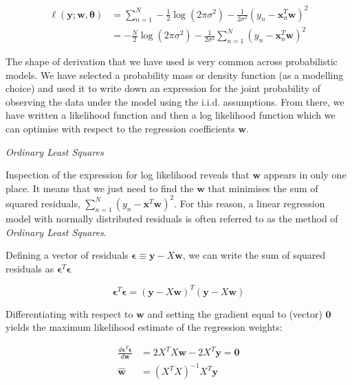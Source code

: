 \documentclass[11pt]{article}
\begin{document}
	\begin{align*}
		\ell(\boldsymbol{y}; \boldsymbol{w}, \boldsymbol{\theta}) &= \sum_{n=1}^{N} -\frac{1}{2}\log(2\pi\sigma^{2}) - \frac{1}{2\sigma^{2}}(y_{n} - \boldsymbol{x}_{n}^{T}\boldsymbol{w})^{2} \\
		&=  -\frac{N}{2}\log(2\pi\sigma^{2}) - \frac{1}{2\sigma^{2}} \sum_{n=1}^{N} (y_{n} - \boldsymbol{x}_{n}^{T}\boldsymbol{w})^{2}
	\end{align*}
	
	The shape of derivation that we have used is very common across probabilistic models. We have selected a probability mass or density function (as a modelling choice) and used it to write down an expression for the joint probability of observing the data under the model using the i.i.d. assumptions. From there, we have written a likelihood function and then a log likelihood function which we can optimise with respect to the regression coefficients $\boldsymbol{w}$.
	
	\emph{Ordinary Least Squares}
	
	Inspection of the expression for log likelihood reveals that $\boldsymbol{w}$ appears in only one place. It means that we just need to find the $\boldsymbol{w}$ that minimises the sum of squared residuals, $\sum_{n=1}^{N} (y_{n} - \boldsymbol{x}^{T}\boldsymbol{w})^{2}$. For this reason, a linear regression model with normally distributed residuals is often referred to as the method of \emph{Ordinary Least Squares}.
	
	Defining a vector of residuals $\boldsymbol{\epsilon} \equiv \boldsymbol{y} - X\boldsymbol{w}$, we can write the sum of squared residuals as $\boldsymbol{\epsilon}^{T}\boldsymbol{\epsilon}$
	
	\begin{equation*}
		\boldsymbol{\epsilon}^{T}\boldsymbol{\epsilon} = (\boldsymbol{y} - X\boldsymbol{w})^{T}(\boldsymbol{y} - X\boldsymbol{w})
	\end{equation*}
	
	Differentiating with respect to $\boldsymbol{w}$ and setting the gradient equal to (vector) $\boldsymbol{0}$ yields the maximum likelihood estimate of the regression weights:
	
	\begin{align*}
		\frac {d \boldsymbol{\epsilon}^{T}\boldsymbol{\epsilon}}{d\boldsymbol{w}} &= 2X^{T}X\boldsymbol{w} -2X^{T}\boldsymbol{y} = \boldsymbol{0} \\
		\boldsymbol{\hat{w}} &= (X^{T}X)^{-1}X^{T}\boldsymbol{y}
	\end{align*}
	
\end{document}
